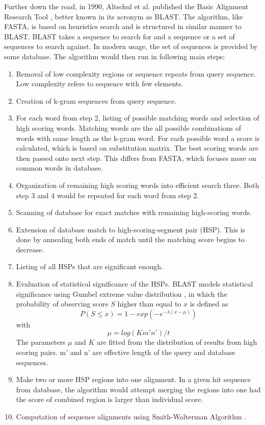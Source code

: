 Further down the road, in 1990, Altschul et al. published the Basic Alignment Research Tool \citep{Altschul90}, better known in its acronym as BLAST. The algorithm, like FASTA, is based on heuristics search and is structured in similar manner to BLAST. BLAST takes a sequence to search for and a sequence or a set of sequences to search against. In modern usage, the set of sequences is provided by some database. The algorithm would then run in following main steps\citep{mount2001bioinformatics}:

\begin{enumerate}
\item Removal of low complexity regions or sequence repeats from query sequence. Low complexity refers to sequence with few elements.
\item Creation of k-gram sequences from query sequence.
\item For each word from step 2, listing of possible matching words and selection of high scoring words. Matching words are the all possible combinations of words with same length as the k-gram word. For each possible word a score is calculated, which is based on substitution matrix. The best scoring words are then passed onto next step. This differs from FASTA, which focuses more on common words in database.
\item Organization of remaining high scoring words into efficient search three. Both step 3 and 4 would be repeated for each word from step 2.
\item Scanning of database for exact matches with remaining high-scoring words.
\item Extension of database match to high-scoring-segment pair (HSP). This is done by annealing both ends of match until the matching score begins to decrease.
\item Listing of all HSPs that are significant enough.
\item Evaluation of statistical significance of the HSPs. BLAST models statistical significance using Gumbel extreme value distribution \citep{gumbel1954statistical}, in which the probability of observing score $S$ higher than equal to $x$ is defined as $$P(S \leq x) = 1 - exp(-e^{- \lambda (x - \mu)})$$ with $$\mu = log(Km'n')/t$$ The parameters $\mu$ and $K$ are fitted from the distribution of results from high scoring pairs. m' and n' are effective length of the query and database sequences.
\item Make two or more HSP regions into one alignment. In a given hit sequence from database, the algorithm would attempt merging the regions into one had the score of combined region is larger than individual score.
\item Computation of sequence alignments using Smith-Walterman Algorithm \citep{smith1981identification}.
\end{enumerate}

